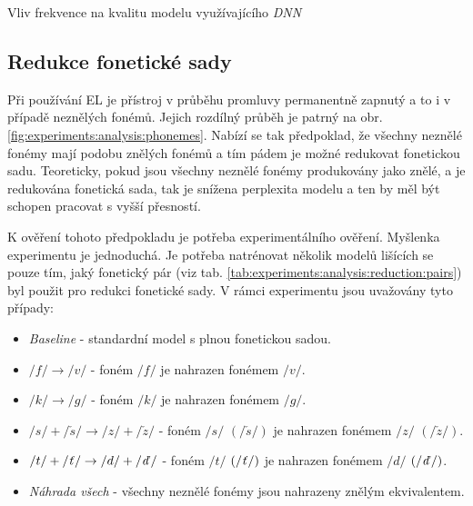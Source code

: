 \begin{table}[htpb]
  \centering
  \def\arraystretch{1.5}
  \caption{Vliv frekvence na kvalitu modelu využívajícího \textit{DNN} }
  \label{tab:experiments:analysis:experiment:dnn}
\end{table}

\subsection{Redukce fonetické sady}
\label{chap:experiments:analysis:reduction}

Při používání EL je přístroj v průběhu promluvy permanentně zapnutý a to i v případě neznělých fonémů. Jejich rozdílný průběh je patrný na obr. \ref{fig:experiments:analysis:phonemes}. Nabízí se tak předpoklad, že všechny neznělé fonémy mají podobu znělých fonémů a tím pádem je možné redukovat fonetickou sadu. Teoreticky, pokud jsou všechny neznělé fonémy produkovány jako znělé, a je redukována fonetická sada, tak je snížena perplexita modelu a ten by měl být schopen pracovat s vyšší přesností.

K ověření tohoto předpokladu je potřeba experimentálního ověření. Myšlenka experimentu je jednoduchá. Je potřeba natrénovat několik modelů lišících se pouze tím, jaký fonetický pár (viz tab. \ref{tab:experiments:analysis:reduction:pairs}) byl použit pro redukci fonetické sady. V rámci experimentu jsou uvažovány tyto případy:

\begin{itemize}
  \item \textit{Baseline} - standardní model s plnou fonetickou sadou.
  \item $/f/ \rightarrow /v/$ - foném $/f/$ je nahrazen fonémem $/v/$.
  \item $/k/ \rightarrow /g/$ - foném $/k/$ je nahrazen fonémem $/g/$.
  \item $/s/+/\check{s}/ \rightarrow /z/+/\check{z}/$ - foném $/s/$ $\left(/\check{s}/\right)$ je nahrazen fonémem $/z/$ $\left(/\check{z}/\right)$.
  \item $/t/+/\text{\textit{ť}}/ \rightarrow /d/+/\text{\textit{ď}}/$ - foném $/t/$ $\left(/\text{\textit{ť}}/\right)$ je nahrazen fonémem $/d/$ $\left(/\text{\textit{ď}}/\right)$.
  \item \textit{Náhrada všech} - všechny neznělé fonémy jsou nahrazeny znělým ekvivalentem.
\end{itemize}

